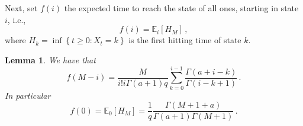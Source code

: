 \documentclass{article}
\numberwithin{equation}{section}
\newcommand{\gk}[1]{\left\{#1\right\}}
\newcommand{\ek}[1]{\left[#1\right]}
\newcommand{\rk}[1]{\left(#1\right)}
\newcommand{\E}     {\mathbb{E}}
\newcommand{\1}{\mathbbm{1}}
\newtheorem{lemma}{Lemma}[section]
\begin{document}
Next, set $f(i)$ the expected time to reach the state of all ones, starting in state $i$, i.e., 
\begin{equation}
    f(i)=\E_i\ek{H_M}\, ,
\end{equation}
where $H_k=\inf\gk{t\ge 0\colon X_t=k}$ is the first hitting time of state $k$.
\begin{lemma}
    We have that
    \begin{equation}
        f(M-i)=\frac{M}{i!i\Gamma(a+1)q}\sum_{k=0}^{i-1}\frac{\Gamma(a+i-k)}{\Gamma(i-k+1)}\, .
    \end{equation}
    In particular
    \begin{equation}\label{eq:313251}
       f(0)=\E_0[H_M]=\frac{1}{q}\frac{\Gamma\rk{M+1+a}}{\Gamma(a+1)\Gamma(M+1)}\, .
    \end{equation}
\end{lemma}
\end{document}
